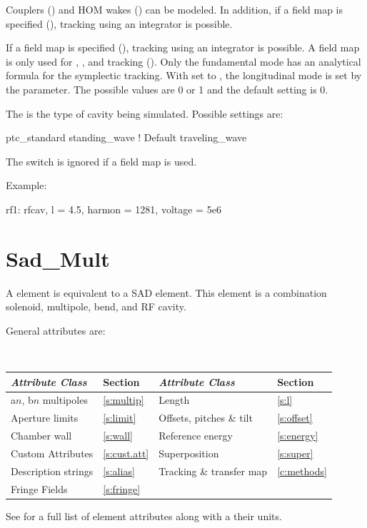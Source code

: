 {Couplers () and HOM wakes () can
be modeled. In addition, if a field map is specified
(), tracking using an integrator is possible.

If a field map is specified (), tracking using an integrator is possible. A field
map is only used for , , and  tracking
(). Only the fundamental mode has an analytical formula for the symplectic
tracking. With  set to , the longitudinal mode is set by the
 parameter. The possible values are 0 or 1 and the default setting is 0.

The  is the type of cavity being simulated. Possible
settings are:
\begin{example}
  ptc_standard
  standing_wave    ! Default
  traveling_wave
\end{example}
The  switch is ignored if a field map is used.

Example:
\begin{example}
  rf1: rfcav, l = 4.5, harmon = 1281, voltage = 5e6
\end{example}

\newpage

\section{Sad_Mult}
\label{s:sad.mult}

A  element is equivalent to a SAD\cite{b:sad} 
element. This element is a combination solenoid, multipole, bend, and
RF cavity.

General  attributes are:
\begin{center}
\tt
\begin{tabular}{llll} \toprule
  {\sl Attribute Class}      & Section           & {\sl Attribute Class}      & Section         \\ \midrule
  a$n$, b$n$ multipoles      & \ref{s:multip}    & Length                     & \ref{s:l}       \\
  Aperture limits            & \ref{s:limit}     & Offsets, pitches \& tilt   & \ref{s:offset}  \\
  Chamber wall               & \ref{s:wall}      & Reference energy           & \ref{s:energy}  \\ 
  Custom Attributes          & \ref{s:cust.att}  & Superposition              & \ref{s:super}   \\
  Description strings        & \ref{s:alias}     & Tracking \& transfer map   & \ref{c:methods} \\ 
  Fringe Fields              & \ref{s:fringe}    &                            &                 \\
  \bottomrule
\end{tabular}
\end{center}
\toffset
See  for a full list of element attributes along with a their units.

}
